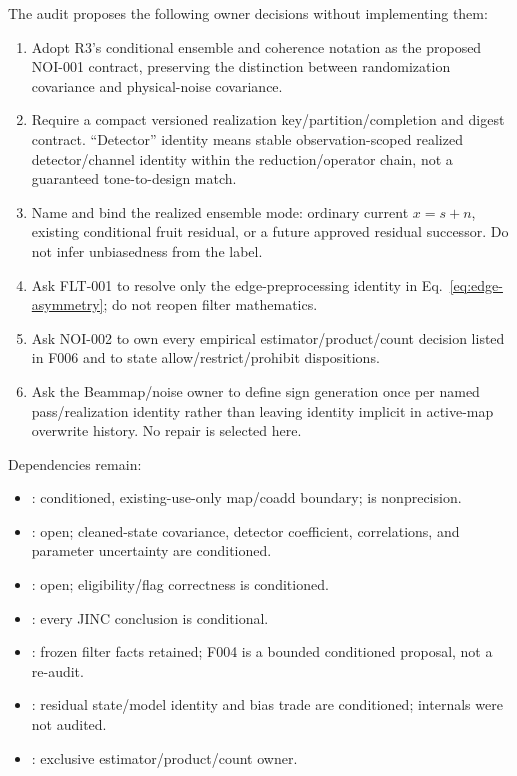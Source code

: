 \documentclass[10pt]{article}
\begin{document}
The audit proposes the following owner decisions without implementing them:

\begin{enumerate}[leftmargin=*]
  \item Adopt R3's conditional ensemble and coherence notation as the proposed
        NOI-001 contract, preserving the distinction between randomization
        covariance and physical-noise covariance.
  \item Require a compact versioned realization key/partition/completion and
        digest contract.  ``Detector'' identity means stable
        observation-scoped realized detector/channel identity within the
        reduction/operator chain, not a guaranteed tone-to-design match.
  \item Name and bind the realized ensemble mode: ordinary current $x=s+n$,
        existing conditional fruit residual, or a future approved residual
        successor.  Do not infer unbiasedness from the label.
  \item Ask FLT-001 to resolve only the edge-preprocessing identity in
        Eq.~\eqref{eq:edge-asymmetry}; do not reopen filter mathematics.
  \item Ask NOI-002 to own every empirical estimator/product/count decision
        listed in F006 and to state allow/restrict/prohibit dispositions.
  \item Ask the Beammap/noise owner to define sign generation once per named
        pass/realization identity rather than leaving identity implicit in
        active-map overwrite history.  No repair is selected here.
\end{enumerate}

Dependencies remain:

\begin{itemize}[leftmargin=*]
  \item {}: conditioned, existing-use-only map/coadd boundary;
         is nonprecision.
  \item {}: open; cleaned-state covariance, detector
        coefficient, correlations, and parameter uncertainty are conditioned.
  \item {}: open; eligibility/flag correctness is conditioned.
  \item {}: every JINC conclusion is conditional.
  \item {}: frozen filter facts retained; F004 is a bounded
        conditioned proposal, not a re-audit.
  \item {}: residual state/model identity and bias trade are
        conditioned; internals were not audited.
  \item {}: exclusive estimator/product/count owner.
\end{itemize}
\end{document}
